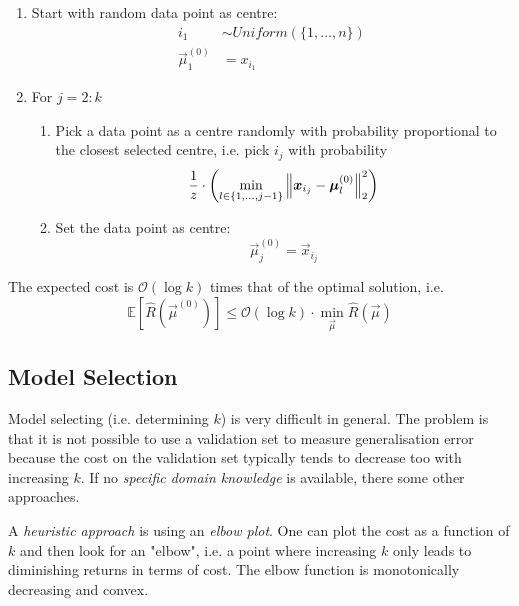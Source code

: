 \begin{enumerate}
    \item Start with random data point as centre:
    \begin{align*}
        i_1 &\sim Uniform(\{1, \dotsc, n\}) \\
        \vec{\mu}_1^{(0)} &= x_{i_1}
    \end{align*}
    
    \item For $j = 2 : k$
    \begin{enumerate}
        \item Pick a data point as a centre randomly
        with probability proportional to the closest
        selected centre, i.e. pick $i_j$ with probability
        \begin{equation*}
            \frac{1}{z} \cdot \left(
                \min_{l \in \{1, \dotsc, j - 1\}}{
                    \left\lVert\boldsymbol{x}_{i_j} - \boldsymbol{\mu}_l^{(0)}\right\rVert_2^2
                }
            \right)
        \end{equation*}
        \item Set the data point as centre:
        \begin{equation*}
            \vec{\mu}_j^{(0)} = \vec{x}_{i_j}
        \end{equation*}
    \end{enumerate}
\end{enumerate}

The expected cost is $\mathcal{O}(\log k)$ times that
of the optimal solution, i.e.
\begin{equation*}
    \mathbb{E}[\hat{R}(\vec{\mu}^{(0)})]
    \leq \mathcal{O}(\log k) \cdot \min_{\vec{\mu}}{\hat{R}(\vec{\mu})}
\end{equation*}


\subsection{Model Selection}
Model selecting (i.e. determining $k$)
is very difficult in general.
The problem is that it is not possible to use a validation
set to measure generalisation error because
the cost on the validation set typically tends to decrease
too with increasing $k$.
If no \emph{specific domain knowledge} is available,
there some other approaches.

A \emph{heuristic approach} is using an \emph{elbow plot}.
One can plot the cost as a function of $k$ and then
look for an "elbow",
i.e. a point where increasing $k$ only leads to
diminishing returns in terms of cost.
The elbow function is monotonically decreasing and convex.

